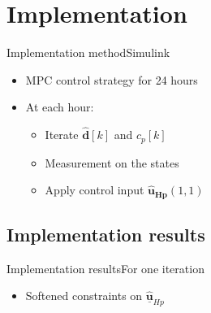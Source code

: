 \section{Implementation}

\begin{frame}{Implementation method}{Simulink}
\begin{itemize}
\item<1-> MPC control strategy for 24 hours
\item<1-> At each hour:
	 	\begin{itemize}
	 	\item<1-> Iterate $\hat{\pmb{d}}[k]$ and $c_p [k]$
	 	\item<1-> Measurement on the states 
	 	\item<1-> Apply control input $\pmb{\hat{u}_{Hp}}(1,1)$
	 	\end{itemize}
\end{itemize}

\begin{figure}[H]
\centering
 
\end{figure}

\end{frame}


\subsection{Implementation results}

\begin{frame}{Implementation results}{For one iteration}

\begin{itemize}
	 	\item<1-> Softened constraints on $\hat{\pmb{\underline{u}}}_{Hp}$
	 	\end{itemize}

\begin{figure}[H]
   \centering
    
\end{figure}

\end{frame}


